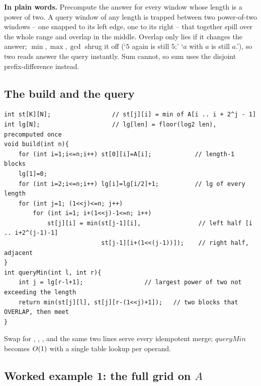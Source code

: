 \noindent\textbf{In plain words.}  Precompute the answer for every window whose length is a power of two. A query window of any length is trapped between two power-of-two windows -- one snapped to its left edge, one to its right -- that together spill over the whole range and overlap in the middle. Overlap only lies if it changes the answer; \(\min,\max,\gcd\) shrug it off (`\(5\) again is still \(5\);' `\(a\) with \(a\) is still \(a\).'), so two reads answer the query instantly. Sum cannot, so sum uses the disjoint prefix-difference instead.

\subsection{The build and the query}

\begin{lstlisting}[caption={sparse table for range minimum: fill every power-of-two block from two half blocks; answer with two overlapping O(1) reads}, label={lst:c19-sparse}]
int st[K][N];                 // st[j][i] = min of A[i .. i + 2^j - 1]
int lg[N];                    // lg[len] = floor(log2 len), precomputed once
void build(int n){
    for (int i=1;i<=n;i++) st[0][i]=A[i];            // length-1 blocks
    lg[1]=0;
    for (int i=2;i<=n;i++) lg[i]=lg[i/2]+1;          // lg of every length
    for (int j=1; (1<<j)<=n; j++)
        for (int i=1; i+(1<<j)-1<=n; i++)
            st[j][i] = min(st[j-1][i],                // left half [i .. i+2^(j-1)-1]
                           st[j-1][i+(1<<(j-1))]);    // right half, adjacent
}
int queryMin(int l, int r){
    int j = lg[r-l+1];                 // largest power of two not exceeding the length
    return min(st[j][l], st[j][r-(1<<j)+1]);   // two blocks that OVERLAP, then meet
}
\end{lstlisting}

Swap  for , , \code{\&}, \code{|} and the same two lines serve every idempotent merge; \(\mathit{queryMin}\) becomes \(O(1)\) with a single table lookup per operand.

\subsection{Worked example 1: the full grid on \(A\)}

